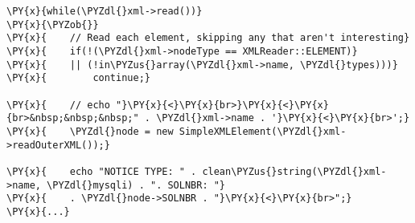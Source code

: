 \begin{Verbatim}[commandchars=\\\{\}]
\PY{x}{while(\PYZdl{}xml->read())}
\PY{x}{\PYZob{}}
\PY{x}{    // Read each element, skipping any that aren't interesting}
\PY{x}{    if(!(\PYZdl{}xml->nodeType == XMLReader::ELEMENT)}
\PY{x}{    || (!in\PYZus{}array(\PYZdl{}xml->name, \PYZdl{}types)))}
\PY{x}{        continue;}

\PY{x}{    // echo "}\PY{x}{<}\PY{x}{br>}\PY{x}{<}\PY{x}{br>&nbsp;&nbsp;&nbsp;" . \PYZdl{}xml->name . '}\PY{x}{<}\PY{x}{br>';}
\PY{x}{    \PYZdl{}node = new SimpleXMLElement(\PYZdl{}xml->readOuterXML());}

\PY{x}{    echo "NOTICE TYPE: " . clean\PYZus{}string(\PYZdl{}xml->name, \PYZdl{}mysqli) . ". SOLNBR: "}
\PY{x}{    . \PYZdl{}node->SOLNBR . "}\PY{x}{<}\PY{x}{br>";}
\PY{x}{...}
\end{Verbatim}
